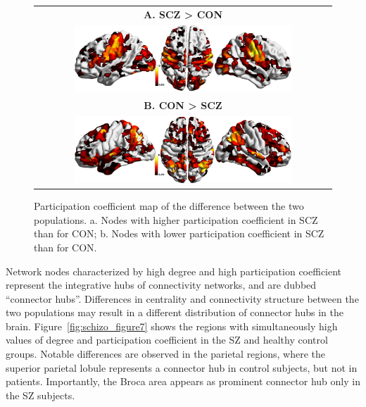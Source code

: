 \begin{figure}[t!]
\centering
    \begin{tabular}{c}
    \textbf{\textsf{A. SCZ > CON}} \\
    \includegraphics[width=0.75\textwidth]{images/schizo/Schizo_PatientGreaterParticipation_3views.jpg} \\
    \textbf{\textsf{B. CON > SCZ}} \\
    \includegraphics[width=0.75\textwidth]{images/schizo/Schizo_PatientLessParticipation_3views.jpg}
    \end{tabular}
\caption{Participation coefficient map of the difference between the two populations. a. Nodes with higher participation coefficient in SCZ than for CON; b. Nodes with lower participation coefficient in SCZ than for CON.}
\label{fig:schizo_figure6}
\end{figure}

Network nodes characterized by high degree and high participation coefficient represent the integrative hubs of connectivity networks, and are dubbed ``connector hubs''.
Differences in centrality and connectivity structure between the two populations may result in a different distribution of connector hubs in the brain.
Figure~\ref{fig:schizo_figure7} shows the regions with simultaneously high values of degree and participation coefficient in the SZ and healthy control groups.
Notable differences are observed in the parietal regions, where the superior parietal lobule represents a connector hub in control subjects, but not in patients. Importantly, the Broca area appears as prominent connector hub only in the SZ subjects.

